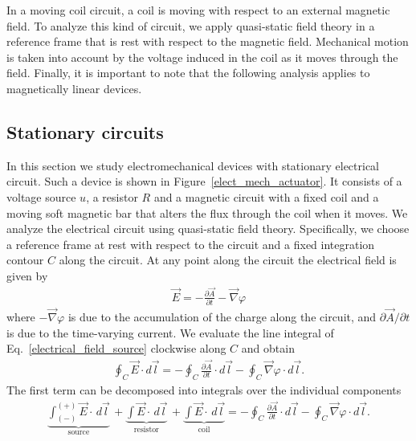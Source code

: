 \documentclass[12pt,a4paper,oneside]{book}
\begin{document}
\begin{onehalfspace}
In a moving coil circuit, a coil is moving with respect to an external magnetic field. To analyze this kind of circuit, we apply quasi-static field theory in a reference frame that is rest with respect to the magnetic field. Mechanical motion is taken into account by the voltage induced in the coil as it moves through the field. Finally, it is important to note that the following analysis applies to magnetically linear devices.
\subsection{Stationary circuits}
In this section we study electromechanical devices with stationary electrical circuit. Such a device is shown in Figure~\ref{elect_mech_actuator}. It consists of a voltage source $u$, a resistor $R$ and a magnetic circuit with a fixed coil and a moving soft magnetic bar that alters the flux through the coil when it moves. We analyze the electrical circuit using quasi-static field theory. Specifically, we choose a reference frame at rest with respect to the circuit and a fixed integration contour $C$ along the circuit. At any point along the circuit the electrical field is given by 
\begin{equation}\label{electrical_field_source}
	\begin{aligned}
		\vec{E} = -\frac{\partial \vec{A}}{\partial t} - \vec{\nabla}\varphi
	\end{aligned}
\end{equation} 
where $-\vec{\nabla}\varphi$ is due to the accumulation of the charge along the circuit, and $\partial \vec{A}/\partial t$ is due to the time-varying current. We evaluate the line integral of Eq.~\eqref{electrical_field_source} clockwise along $C$ and obtain
\begin{equation*}\label{}
	\begin{aligned}
		\oint_{C} \vec{E}\cdot d\vec{l} = -\oint_{C} \frac{\partial \vec{A}}{\partial t}\cdot d\vec{l} - \oint_{C}\vec{\nabla}\varphi\cdot d\vec{l}.
	\end{aligned}
\end{equation*} 
The first term can be decomposed into integrals over the individual components
\begin{equation}\label{faraday_path}
	\begin{aligned}
		\underbrace{\int_{(-)}^{(+)}\vec{E}\cdot\,d\vec{l}}_{\text{source}} \, + \underbrace{\int\vec{E}\cdot\,d\vec{l}}_{\text{resistor}} \, + 
		\underbrace{\int\vec{E}\cdot\,d\vec{l}}_{\text{coil}} = -\oint_{C} \frac{\partial \vec{A}}{\partial t}\cdot d\vec{l} - \oint_{C}\vec{\nabla}\varphi\cdot d\vec{l}.

\end{aligned}
\end{equation}
\end{onehalfspace}
\end{document}
